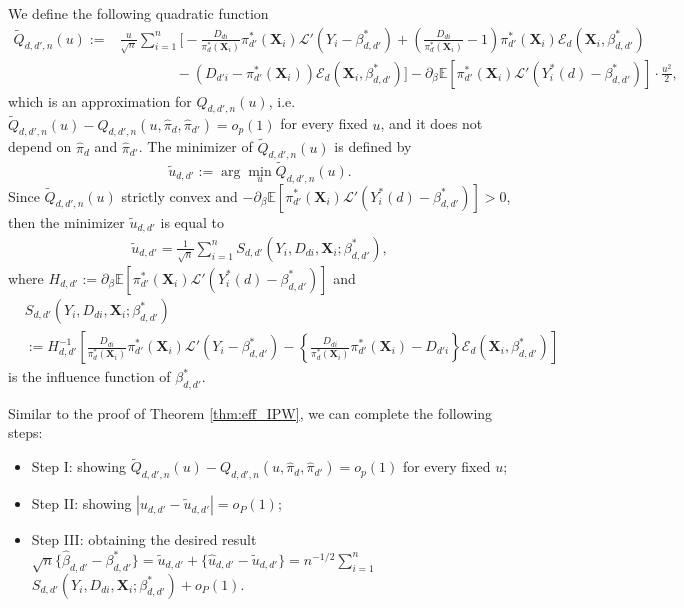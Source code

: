 \documentclass[11pt]{article}
\numberwithin{equation}{section}
\begin{document}
We define the following quadratic function
\begin{align*}
	\widetilde{Q}_{d,d',n}(u):=&\frac{u}{\sqrt{n}}\sum_{i=1}^n\bigg[-\frac{D_{di}}{{\pi}^*_d(\boldsymbol{X}_{i})}\pi_{d'}^*(\boldsymbol{X}_{i})\mathcal{L}'(Y_i-\beta_{d,d'}^*)+\left(\frac{D_{di}}{\pi_d^*(\boldsymbol{X}_{i})}-1\right)\pi_{d'}^*(\boldsymbol{X}_{i})\mathcal{E}_{d}(\boldsymbol{X}_{i},\beta_{d,d'}^*) \\
	&\qquad\qquad-\left(D_{d'i}-\pi_{d'}^*(\boldsymbol{X}_{i})\right)\mathcal{E}_d(\boldsymbol{X}_{i},\beta_{d,d'}^*) \bigg]-\partial_{\beta}\mathbb{E}[\pi_{d'}^*(\boldsymbol{X}_{i})\mathcal{L}'(Y^*_i(d)-\beta_{d,d'}^*)]\cdot \frac{u^2}{2},
\end{align*}
which is an approximation for ${Q}_{d,d',n}(u)$, i.e. $\widetilde{Q}_{d,d',n}(u)-Q_{d,d',n}(u,\widehat{\pi}_d,\widehat{\pi}_{d'})=o_p(1)$ for every fixed $u$, and it does not depend on $\widehat{\pi}_d$ and $\widehat{\pi}_{d'}$. The minimizer of $\widetilde{Q}_{d,d',n}(u)$ is defined by
$$\widetilde{u}_{d,d'}:=\arg\min_{u} \widetilde{Q}_{d,d',n}(u).$$
Since $\widetilde{Q}_{d,d',n}(u)$ strictly convex and $-\partial_{\beta}\mathbb{E}[{\pi}^*_{d'}(\boldsymbol{X}_{i})\mathcal{L}'(Y^*_i(d)-\beta_{d,d'}^*)]>0$, then the minimizer $\widetilde{u}_{d,d'}$ is equal to
\begin{align*}
	\widetilde{u}_{d,d'}=\frac{1}{\sqrt{n}}\sum_{i=1}^nS_{d,d'}(Y_i,D_{di},\boldsymbol{X}_{i};\beta_{d,d'}^*),
\end{align*}
where  $H_{d,d'}:=\partial_{\beta}\mathbb{E}[{\pi}^*_{d'}(\boldsymbol{X}_{i})\mathcal{L}'(Y^*_i(d)-\beta_{d,d'}^*)]$ and
\begin{align*}
	&S_{d,d'}(Y_i,D_{di},\boldsymbol{X}_{i};\beta_{d,d'}^*)\\
	&:=H_{d,d'}^{-1} \left[\frac{D_{di}}{{\pi}^*_d(\boldsymbol{X}_{i})}{\pi}^*_{d'}(\boldsymbol{X}_{i})\mathcal{L}'(Y_i-\beta_{d,d'}^*)-\left\{\frac{D_{di}}{\pi_d^*(\boldsymbol{X}_{i})}\pi^*_{d'}(\boldsymbol{X}_{i})-D_{d'i}\right\}\mathcal{E}_{d}(\boldsymbol{X}_{i},\beta_{d,d'}^*)\right]
\end{align*}
is the influence function of $\beta_{d,d'}^*$.

Similar to the proof of Theorem \ref{thm:eff_IPW},  we can complete the following steps:
\begin{itemize}
	\item Step I: showing $\widetilde{Q}_{d,d',n}(u)-Q_{d,d',n}(u,\widehat{\pi}_d,\widehat{\pi}_{d'})=o_p(1)$ for every fixed $u$;
	\item Step II: showing $|\widehat{u}_{d,d'}-\widetilde{u}_{d,d'}|=o_P(1)$;
	\item Step III: obtaining the desired result $\sqrt{n}\{\widehat{\beta}_{d,d'}-\beta_{d,d'}^*\}=\widetilde{u}_{d,d'}+\{\widehat{u}_{d,d'}-\widetilde{u}_{d,d'}\}=n^{-1/2}\sum_{i=1}^n$ $S_{d,d'}(Y_i,D_{di},\boldsymbol{X}_{i};\beta_{d,d'}^*)+o_P(1)$.
\end{itemize}
\end{document}
